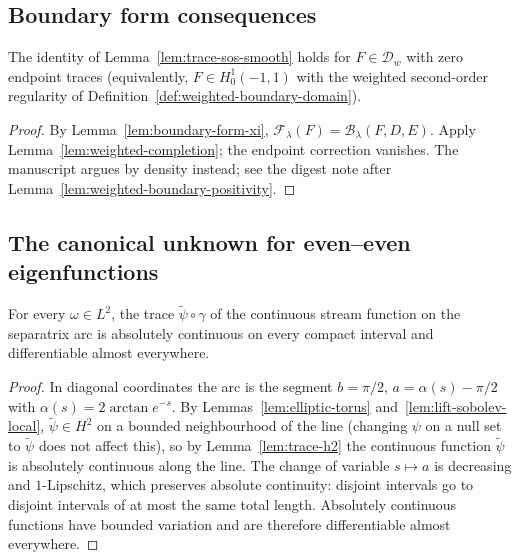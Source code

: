 \subsection{Boundary form consequences}

\begin{lemma}
\label{lem:trace-sos-extension}
\leanok
The identity of Lemma~\ref{lem:trace-sos-smooth} holds for $F\in\mathcal D_w$
with zero endpoint traces (equivalently, $F\in H^1_0(-1,1)$ with the
weighted second-order regularity of Definition~\ref{def:weighted-boundary-domain}).
\end{lemma}

\begin{proof}
\leanok
By Lemma~\ref{lem:boundary-form-xi}, $\mathcal F_\lambda(F)=\mathcal B_\lambda(F,D,E)$.
Apply Lemma~\ref{lem:weighted-completion}; the endpoint correction vanishes.
The manuscript argues by density instead; see the digest note after
Lemma~\ref{lem:weighted-boundary-positivity}.
\end{proof}

\subsection{The canonical unknown for even--even eigenfunctions}

\begin{lemma}
\label{lem:arc-trace-ac}
\leanok
For every $\omega\in L^2$, the trace $\tilde\psi\circ\gamma$ of the continuous stream function
on the separatrix arc is absolutely continuous on every compact interval and differentiable
almost everywhere.
\end{lemma}

\begin{proof}
\leanok
In diagonal coordinates the arc is the segment $b=\pi/2$, $a=\alpha(s)-\pi/2$ with
$\alpha(s)=2\arctan e^{-s}$. By Lemmas~\ref{lem:elliptic-torus} and~\ref{lem:lift-sobolev-local},
$\tilde\psi\in H^2$ on a bounded neighbourhood of the line (changing $\psi$ on a null set to
$\tilde\psi$ does not affect this), so by Lemma~\ref{lem:trace-h2} the continuous function
$\tilde\psi$ is absolutely continuous along the line. The change of variable $s\mapsto a$ is
decreasing and $1$-Lipschitz, which preserves absolute continuity: disjoint intervals go to
disjoint intervals of at most the same total length. Absolutely continuous functions have
bounded variation and are therefore differentiable almost everywhere.
\end{proof}

